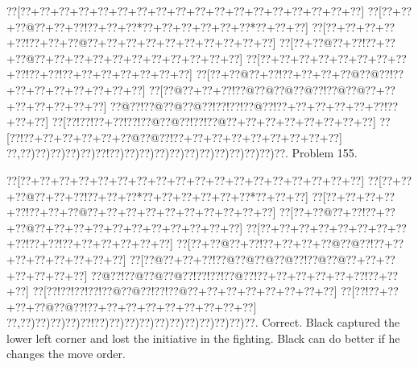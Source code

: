 \documentclass[a5paper]{article}
\begin{document}
\begin{center}
{\goo
\0??[\0??+\0??+\0??+\0??+\0??+\0??+\0??+\0??+\0??+\0??+\0??+\0??+\0??+\0??+\0??+\0??+\0??+\0??]
\0??[\0??+\0??+\0??@\0??+\0??+\0??!\0??+\0??+\0??*\0??+\0??+\0??+\0??+\0??+\0??*\0??+\0??+\0??]
\0??[\0??+\0??+\0??+\0??+\0??!\0??+\0??+\0??@\0??+\0??+\0??+\0??+\0??+\0??+\0??+\0??+\0??+\0??]
\0??[\0??+\0??@\0??+\0??!\0??+\0??+\0??@\0??+\0??+\0??+\0??+\0??+\0??+\0??+\0??+\0??+\0??+\0??]
\0??[\0??+\0??+\0??+\0??+\0??+\0??+\0??+\0??+\0??!\0??+\0??!\0??+\0??+\0??+\0??+\0??+\0??+\0??]
\0??[\0??+\0??@\0??+\0??!\0??+\0??+\0??+\0??@\0??@\0??!\0??+\0??+\0??+\0??+\0??+\0??+\0??+\0??]
\0??[\0??@\0??+\0??+\0??!\0??@\0??@\0??@\0??@\0??!\0??@\0??@\0??+\0??+\0??+\0??+\0??+\0??+\0??]
\0??@\0??!\0??@\0??@\0??@\0??!\0??!\0??!\0??@\0??!\0??+\0??+\0??+\0??+\0??+\0??!\0??+\0??+\0??]
\0??[\0??!\0??!\0??+\0??!\0??!\0??@\0??@\0??!\0??!\0??@\0??+\0??+\0??+\0??+\0??+\0??+\0??+\0??]
\0??[\0??!\0??+\0??+\0??+\0??+\0??+\0??@\0??@\0??!\0??+\0??+\0??+\0??+\0??+\0??+\0??+\0??+\0??]
\0??,\0??)\0??)\0??)\0??)\0??)\0??!\0??)\0??)\0??)\0??)\0??)\0??)\0??)\0??)\0??)\0??)\0??)\0??.
}
Problem 155.

\end{center}
\begin{center}
{\goo
\0??[\0??+\0??+\0??+\0??+\0??+\0??+\0??+\0??+\0??+\0??+\0??+\0??+\0??+\0??+\0??+\0??+\0??+\0??]
\0??[\0??+\0??+\0??@\0??+\0??+\0??!\0??+\0??+\0??*\0??+\0??+\0??+\0??+\0??+\0??*\0??+\0??+\0??]
\0??[\0??+\0??+\0??+\0??+\0??!\0??+\0??+\0??@\0??+\0??+\0??+\0??+\0??+\0??+\0??+\0??+\0??+\0??]
\0??[\0??+\0??@\0??+\0??!\0??+\0??+\0??@\0??+\0??+\0??+\0??+\0??+\0??+\0??+\0??+\0??+\0??+\0??]
\0??[\0??+\0??+\0??+\0??+\0??+\0??+\0??+\0??+\0??!\0??+\0??!\0??+\0??+\0??+\0??+\0??+\0??]
\0??[\0??+\0??@\0??+\0??!\0??+\0??+\0??+\0??@\0??@\0??!\0??+\0??+\0??+\0??+\0??+\0??+\0??+\0??]
\0??[\0??@\0??+\0??+\0??!\0??@\0??@\0??@\0??@\0??!\0??@\0??@\0??+\0??+\0??+\0??+\0??+\0??+\0??]
\0??@\0??!\0??@\0??@\0??@\0??!\0??!\0??!\0??@\0??!\0??+\0??+\0??+\0??+\0??+\0??!\0??+\0??+\0??]
\0??[\0??!\0??!\0??!\0??!\0??@\0??@\0??!\0??!\0??@\0??+\0??+\0??+\0??+\0??+\0??+\0??+\0??]
\0??[\0??!\0??+\0??+\0??+\0??@\0??@\0??!\0??+\0??+\0??+\0??+\0??+\0??+\0??+\0??+\0??]
\0??,\0??)\0??)\0??)\0??)\0??!\0??)\0??)\0??)\0??)\0??)\0??)\0??)\0??)\0??)\0??)\0??.
}
Correct. Black captured the lower left corner and lost the initiative in the fighting. Black can do better if he changes the move order.

\end{center}
\end{document}
